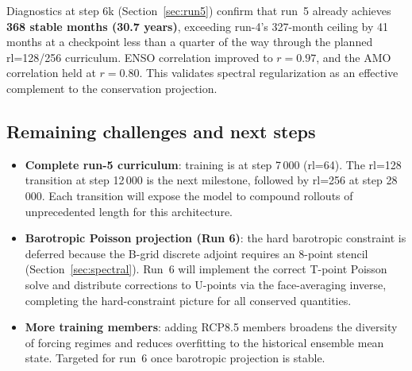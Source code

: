 \documentclass[11pt]{article}
\begin{document}
Diagnostics at step 6k (Section~\ref{sec:run5}) confirm that run~5 already
achieves \textbf{368 stable months (30.7 years)}, exceeding run-4's 327-month
ceiling by 41 months at a checkpoint less than a quarter of the way through the
planned rl=128/256 curriculum. ENSO correlation improved to $r=0.97$, and the
AMO correlation held at $r=0.80$. This validates spectral regularization as
an effective complement to the conservation projection.

\subsection{Remaining challenges and next steps}

\begin{itemize}[itemsep=2pt]
  \item \textbf{Complete run-5 curriculum}: training is at step 7\,000 (rl=64).
    The rl=128 transition at step 12\,000 is the next milestone, followed by
    rl=256 at step 28\,000. Each transition will expose the model to compound
    rollouts of unprecedented length for this architecture.
  \item \textbf{Barotropic Poisson projection (Run 6)}: the hard barotropic
    constraint is deferred because the B-grid discrete adjoint requires an
    8-point stencil (Section~\ref{sec:spectral}). Run~6 will implement the
    correct T-point Poisson solve and distribute corrections to U-points via
    the face-averaging inverse, completing the hard-constraint picture for all
    conserved quantities.
  \item \textbf{More training members}: adding RCP8.5 members broadens the
    diversity of forcing regimes and reduces overfitting to the historical
    ensemble mean state. Targeted for run~6 once barotropic projection is stable.
\end{itemize}
\end{document}
